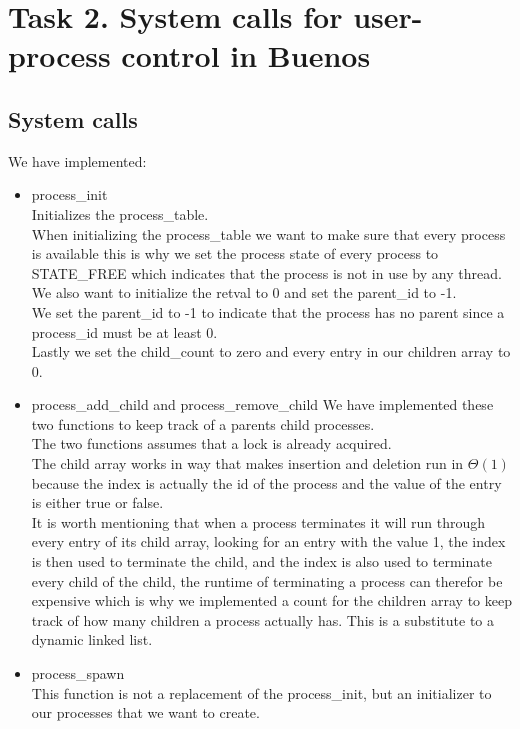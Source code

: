 \documentclass[a4paper,12pt,danish]{report}
\begin{document}
\section{Task 2. System calls for user-process control in Buenos}
\subsection{System calls}
We have implemented:
\begin{itemize}
  \item{process\_init}
    \\
    Initializes the process\_table.
    \\
    When initializing the process\_table we want to make sure that every process is available this is why we set the process state of every process to STATE\_FREE which indicates that the process is not in use by any thread.
    We also want to initialize the retval to 0 and set the parent\_id to -1.
    \\
    We set the parent\_id to -1 to indicate that the process has no parent since a process\_id must be at least 0.\\
    Lastly we set the child\_count to zero and every entry in our children array to 0.
  \item{process\_add\_child and process\_remove\_child}
  We have implemented these two functions to keep track of a parents child processes.
  \\
  The two functions assumes that a lock is already acquired.
  \\
  The child array works in way that makes insertion and deletion run in $\Theta(1)$ because the index is actually the id of the process and the value of the entry is either true or false.
  \\
  It is worth mentioning that when a process terminates it will run through every entry of its child array, looking for an entry with the value 1, the index is then used to terminate the child, and the index is also used to terminate every child of the child, the runtime of terminating a process can therefor be expensive which is why we implemented a count for the children array to keep track of how many children a process actually has.
  This is a substitute to a dynamic linked list.
  \item{process\_spawn}
  \\
  This function is not a replacement of the process\_init, but an initializer to our processes that we want to create.
  \\

\end{itemize}
\end{document}
